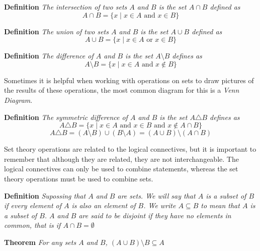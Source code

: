 \textbf{Definition} \textit{The intersection of two sets $A$ and $B$ is the set $A \cap B$ defined as} \[A \cap B = \{x \mid x \in A \text{ and }x \in B\}\]

\textbf{Definition} \textit{The union of two sets $A$ and $B$ is the set $A \cup B$ defined as} \[A \cup B = \{x \mid x \in A \text{ or } x \in B\}\]

\textbf{Definition} \textit{The difference of $A$ and $B$ is the set $A \setminus B$ defines as} \[A \setminus B = \{x \mid x \in A \text{ and } x \notin B\}\]

Sometimes it is helpful when working with operations on sets to draw pictures of the results of these operations, the most common diagram for this is a \textit{Venn Diagram}.

\textbf{Definition} \textit{The symmetric difference of $A$ and $B$ is the set $A \triangle B$ defines as} \[A \triangle B = \{x \mid x \in A \text{ and } x \in B \text{ and } x \notin A \cap B\}\] \[A \triangle B = (A \setminus B) \cup (B \setminus A) = (A \cup B) \setminus (A \cap B)\]

Set theory operations are related to the logical connectives, but it is important to remember that although they are related, they are not interchangeable. The logical connectives can only be used to combine statements, whereas the set theory operations must be used to combine sets.

\textbf{Definition} \textit{Supossing that $A$ and $B$ are sets. We will say that $A$ is a subset of $B$ if every element of $A$ is also an element of $B$. We write $A \subseteq B$ to mean that $A$ is a subset of $B$. $A$ and $B$ are said to be disjoint if they have no elements in common, that is if $A \cap B = \emptyset$}

\textbf{Theorem} \textit{For any sets $A$ and $B$, $(A \cup B) \setminus B \subseteq A$}
